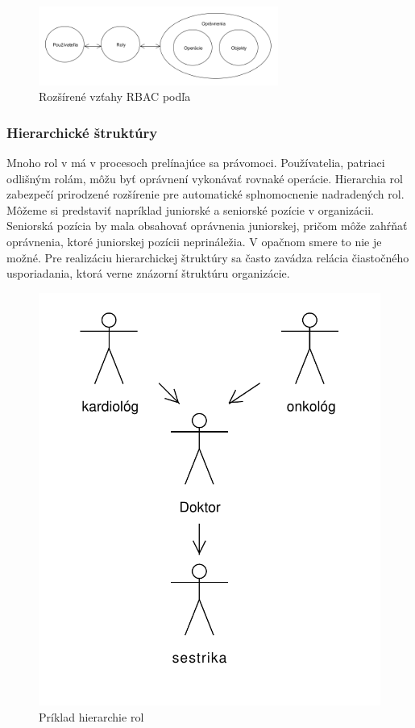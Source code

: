 \begin{figure}[H]
	\centerline{\includegraphics[width=0.7\textwidth]{images/rbac_kuhn_full}}
	\caption{Rozšírené vzťahy RBAC podľa \cite{kuhn}}
	\label{obr:rbac_kuhn_full}
\end{figure}



\subsubsection{Hierarchické štruktúry}
Mnoho rol v má v procesoch prelínajúce sa právomoci. Používatelia, patriaci odlišným rolám, môžu byť oprávnení vykonávať rovnaké operácie. Hierarchia rol zabezpečí prirodzené rozšírenie pre automatické splnomocnenie nadradených rol. Môžeme si predstaviť napríklad juniorské a seniorské pozície v organizácii. Seniorská pozícia by mala obsahovať oprávnenia juniorskej, pričom môže zahŕňať oprávnenia, ktoré juniorskej pozícii neprináležia.   V opačnom smere to nie je možné.  Pre realizáciu hierarchickej štruktúry sa často zavádza relácia čiastočného usporiadania, ktorá verne znázorní štruktúru organizácie. 

\begin{figure}[h]
	\centerline{\includegraphics[height=0.45\textwidth]{images/hierarchia_priklad}}
	\caption{Príklad hierarchie rol}
	\label{obr:rbac_hierarchy}
\end{figure}






